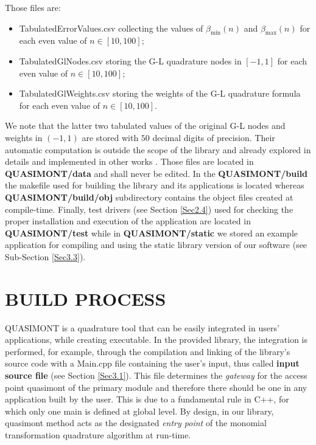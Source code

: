 \documentclass[a4paper, twosided]{book}
\begin{document}
\noindent 
 Those files are:
\begin{itemize}
    \item \colorbox{poliGrayBlue}{TabulatedErrorValues.csv} collecting the values of $\beta_{\text{min}}(n)$ and $\beta_{\text{max}}(n)$ for each even value of $n\in[10,100]$;
    \item \colorbox{poliGrayBlue}{TabulatedGlNodes.csv} storing the G-L quadrature nodes in $[-1,1]$ for each even value of $n\in[10,100]$;
    \item \colorbox{poliGrayBlue}{TabulatedGlWeights.csv} storing the weights of the G-L quadrature formula for each even value of $n\in[10,100]$.
\end{itemize}
We note that the latter two tabulated values of the original G-L nodes and weights in $(-1,1)$ are stored with $50$ decimal digits of precision. Their automatic computation is outside the scope of the library and already explored in details and implemented in other works \cite{Gautschi94,Hale13}. Those files are located in \colorbox{poliGrayBlue}{\textbf{QUASIMONT/data}} and shall never be edited. In the \colorbox{poliGrayBlue}{\textbf{QUASIMONT/build}} the \colorbox{poliGrayBlue}{makefile} used for building the library and its applications is located whereas \colorbox{poliGrayBlue}{\textbf{QUASIMONT/build/obj}} subdirectory contains the object files created at compile-time. Finally, test drivers (see Section \ref{Sec2.4}) used for checking the proper installation and execution of the application are located in \colorbox{poliGrayBlue}{\textbf{QUASIMONT/test}} while in \colorbox{poliGrayBlue}{\textbf{QUASIMONT/static}} we stored an example application for compiling and using the static library version of our software (see Sub-Section \ref{Sec3.3}).

\newpage
\section[Build process]{\changefont BUILD PROCESS}\label{Sec2.3}

\noindent
QUASIMONT is a quadrature tool that can be easily integrated in  users' applications, while creating executable. In the provided library, the integration is performed, for example, through the compilation and linking of the library's source code with a \colorbox{poliGrayBlue}{Main.cpp} file containing the user's input, thus called \color{poliDarkBlue} \textbf{input source file} \color{black} (see Section \ref{Sec3.1}). This file determines the {\itshape gateway} for the access point \colorbox{poliGrayBlue}{quasimont} of the primary module and therefore there should be one in any application built by the user. This is due to a fundamental rule in C++, for which only one \colorbox{poliGrayBlue}{main} is defined at global level. By design, in our library, \colorbox{poliGrayBlue}{quasimont} method acts as the designated {\itshape entry point} of the monomial transformation quadrature algorithm at run-time.
\end{document}
